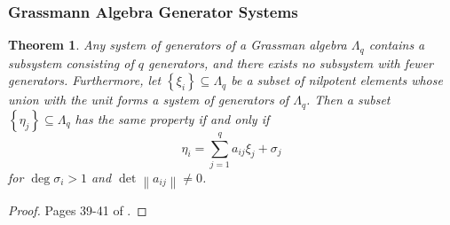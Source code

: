 \documentclass{article}
\newtheorem{theorem}{Theorem}
\theoremstyle{definition}
\begin{document}
\subsubsection{Grassmann Algebra Generator Systems}

\begin{theorem}
    \label{thm:grassmann_generators}
    Any system of generators of a Grassman algebra $\Lambda_q$ contains a subsystem consisting of $q$ generators, and there exists no subsystem with fewer generators. Furthermore, let $\left\{ \xi_i \right\} \subseteq \Lambda_q$ be a subset of nilpotent elements whose union with the unit forms a system of generators of $\Lambda_q$. Then a subset $\left\{ \eta_j \right\} \subseteq \Lambda_q$ has the same property if and only if
    \begin{equation*}
        \eta_i = \sum_{j = 1}^{q} a_{ij} \xi_j + \sigma_j
    \end{equation*}
    for $\deg \sigma_i > 1$ and $\det \left\| a_{ij} \right\| \neq 0$.
\end{theorem}
\begin{proof}
    Pages 39-41 of \cite{berezin_introduction_1987}.
\end{proof}
\end{document}
